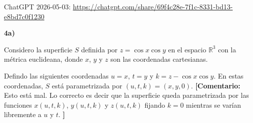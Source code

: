 \documentclass[11pt,spanish]{article}
\newcommand{\comentario}[1]{{\color{red} {\bf [Comentario:} #1 {\bf ]}}}
\begin{document}

\thispagestyle{empty} %

%


%
%

ChatGPT 2026-05-03: \url{https://chatgpt.com/share/69f4c28e-7f1c-8331-bd13-e8bd7c0f1230}

\vspace{0.5cm}

\vspace{0.5cm}
{\bf 4a)}
\vspace{0.5cm}

Considero la superficie $S$ definida por $z=\cos x\cos y$ en el espacio $\mathbb{R}^3$ con la m\'etrica euclideana, donde $x$, $y$ y $z$ son las coordenadas cartesianas.

Defindo las siguientes coordenadas $u=x$, $t=y$ y $k=z-\cos x\cos y$.
En estas coordenadas, $S$ est\'a parametrizada por  $(u,t,k)=(x,y,0)$.
\comentario{Esto est\'a mal. Lo correcto es decir que la superficie queda parametrizada por las funciones $x(u,t,k)$, $y(u,t,k)$ y $z(u,t,k)$ fijando $k=0$ mientras se var\'ian libremente a $u$ y $t$.}
\end{document}
